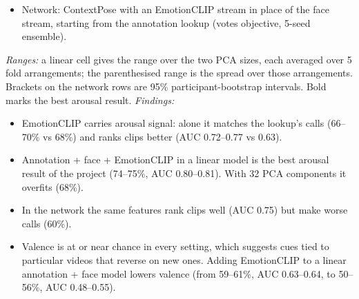 \documentclass[11pt]{article}
\begin{document}
\begin{table}[!htbp]
{\begin{itemize}
  \item Network: ContextPose with an EmotionCLIP stream in place of the face stream, starting from the annotation lookup (votes objective, 5-seed ensemble).
\end{itemize}
\emph{Ranges:} a linear cell gives the range over the two PCA sizes, each averaged over 5 fold arrangements; the parenthesised range is the spread over those arrangements. Brackets on the network rows are 95\% participant-bootstrap intervals. Bold marks the best arousal result.
\emph{Findings:}
\begin{itemize}
  \item EmotionCLIP carries arousal signal: alone it matches the lookup's calls (66--70\% vs 68\%) and ranks clips better (AUC 0.72--0.77 vs 0.63).
  \item Annotation + face + EmotionCLIP in a linear model is the best arousal result of the project (74--75\%, AUC 0.80--0.81). With 32 PCA components it overfits (68\%).
  \item In the network the same features rank clips well (AUC 0.75) but make worse calls (60\%).
  \item Valence is at or near chance in every setting, which suggests cues tied to particular videos that reverse on new ones. Adding EmotionCLIP to a linear annotation + face model lowers valence (from 59--61\%, AUC 0.63--0.64, to 50--56\%, AUC 0.48--0.55).
\end{itemize}}
\end{table}
\end{document}
